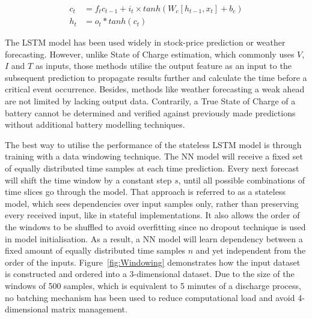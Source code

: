 \begin{equation}
    \begin{split}
        c_t &= f_t c_{t-1}+i_t \times tanh \left(W_c \left[h_{t-1}, x_t \right] + b_c \right) \\
        h_t &= o_t*tanh \left(c_t \right)
    \end{split}
    \label{eq:LSTM-output2}
\end{equation}

%
%
The LSTM model has been used widely in stock-price prediction or weather forecasting.
However, unlike State of Charge estimation, which commonly uses $V$, $I$ and $T$ as inputs, those methods utilise the output feature as an input to the subsequent prediction to propagate results further and calculate the time before a critical event occurrence.
Besides, methods like weather forecasting a weak ahead are not limited by lacking output data. 
Contrarily, a True State of Charge of a battery cannot be determined and verified against previously made predictions without additional battery modelling techniques.

%
%
The best way to utilise the performance of the stateless LSTM model is through training with a data windowing technique.
The NN model will receive a fixed set of equally distributed time samples at each time prediction.
Every next forecast will shift the time window by a constant step $s$, until all possible combinations of time slices go through the model.
That approach is referred to as a stateless model, which sees dependencies over input samples only, rather than preserving every received input, like in stateful implementations.
It also allows the order of the windows to be shuffled to avoid overfitting since no dropout technique is used in model initialisation.
As a result, a NN model will learn dependency between a fixed amount of equally distributed time samples $n$ and yet independent from the order of the inputs.
\mbox{Figure~\ref{fig:Windowing}} demonstrates how the input dataset is constructed and ordered into a 3-dimensional dataset.
Due to the size of the windows of 500 samples, which is equivalent to 5 minutes of a discharge process, no batching mechanism has been used to reduce computational load and avoid 4-dimensional matrix management.


